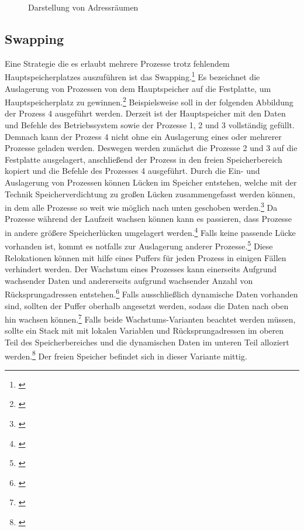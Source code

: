 \begin{figure}[htb]
	\centering
	\caption{Darstellung von Adressräumen}
\end{figure}

\subsection{Swapping}
\label{subsec:Swapping}
Eine Strategie die es erlaubt mehrere Prozesse trotz fehlendem Hauptspeicherplatzes auszuführen ist das Swapping.\footnote{\cite[S.~245]{Tanenbaum.2016}} Es bezeichnet die Auslagerung von Prozessen von dem Hauptspeicher auf die Festplatte, um Hauptspeicherplatz zu gewinnen.\footnote{\cite[S.~245]{Tanenbaum.2016}} Beispielsweise soll in der folgenden Abbildung der Prozess 4 ausgeführt werden. Derzeit ist der Hauptspeicher mit den Daten und Befehle des Betriebssystem sowie der Prozesse 1, 2 und 3 vollständig gefüllt. Demnach kann der Prozess 4 nicht ohne ein Auslagerung eines oder mehrerer Prozesse geladen werden. Deswegen werden zunächst die Prozesse 2 und 3 auf die Festplatte ausgelagert, anschließend der Prozess in den freien Speicherbereich kopiert und die Befehle des Prozesses 4 ausgeführt. Durch die Ein- und Auslagerung von Prozessen können Lücken im Speicher entstehen, welche mit der Technik Speicherverdichtung zu großen Lücken zusammengefasst werden können, in dem alle Prozesse so weit wie möglich nach unten geschoben werden.\footnote{\cite[S.~246]{Tanenbaum.2016}} Da Prozesse während der Laufzeit wachsen können kann es passieren, dass Prozesse in andere größere Speicherlücken umgelagert werden.\footnote{\cite[S.~247]{Tanenbaum.2016}} Falls keine passende Lücke vorhanden ist, kommt es notfalls zur Auslagerung anderer Prozesse.\footnote{\cite[S.~247]{Tanenbaum.2016}} Diese Relokationen können mit hilfe eines Puffers für jeden Prozess in einigen Fällen verhindert werden. Der Wachstum eines Prozesses kann einerseits Aufgrund wachsender Daten und andererseits aufgrund wachsender Anzahl von Rücksprungadressen entstehen.\footnote{\cite[S.~247]{Tanenbaum.2016}} Falls ausschließlich dynamische Daten vorhanden sind, sollten der Puffer oberhalb angesetzt werden, sodass die Daten nach oben hin wachsen können.\footnote{\cite[S.~247]{Tanenbaum.2016}} Falls beide Wachstums-Varianten beachtet werden müssen, sollte ein Stack mit mit lokalen Variablen und Rücksprungadressen im oberen Teil des Speicherbereiches und die dynamischen Daten im unteren Teil alloziert werden.\footnote{\cite[S.~247]{Tanenbaum.2016}} Der freien Speicher befindet sich in dieser Variante mittig.

